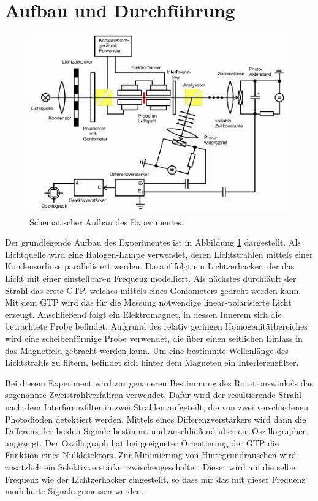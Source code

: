 \newpage
\section{Aufbau und Durchführung}

\begin{figure}
  \centering
  \includegraphics[width = \textwidth]{Pics/Aufbau.pdf}
  \caption{Schematischer Aufbau des Experimentes\cite{anleitung}.}
  \label{fig:Aufbau}
\end{figure}

Der grundlegende Aufbau des Experimentes ist in Abbildung \ref{fig:Aufbau}
dargestellt. Als Lichtquelle wird eine Halogen-Lampe verwendet, deren Lichtstrahlen
mittels einer Kondensorlinse parallelisiert werden. Darauf folgt ein Lichtzerhacker,
der das Licht mit einer einstellbaren Frequeuz modelliert. Als nächstes durchläuft
der Strahl das erste GTP, welches mittels eines Goniometers gedreht werden kann.
Mit dem GTP wird das für die Messung notwendige linear-polarisierte Licht erzeugt.
Anschließend folgt ein Elektromagnet, in dessen Innerem sich die betrachtete
Probe befindet. Aufgrund des relativ geringen Homogenitätbereiches wird eine
scheibenförmige Probe verwendet, die über einen seitlichen Einlass in das
Magnetfeld gebracht werden kann. Um eine bestimmte Wellenlänge des Lichtstrahls
zu filtern, befindet sich hinter dem Magneten ein Interferenzfilter.

Bei diesem Experiment wird zur genaueren Bestimmung des Rotationswinkels das
sogenannte Zweistrahlverfahren verwendet. Dafür wird der resultierende Strahl
nach dem Interferenzfilter in zwei Strahlen aufgeteilt, die von zwei verschiedenen
Photodioden detektiert werden. Mittels eines Differenzverstärkers wird dann die
Differenz der beiden Signale bestimmt und anschließend über ein Oszillographen
angezeigt. Der Oszillograph hat bei geeigneter Orientierung der GTP die Funktion
eines Nulldetektors. Zur Minimierung von Hintegrundrauschen wird zusätzlich ein Selektivverstärker
zwischengeschaltet. Dieser wird auf die selbe Frequenz wie der Lichtzerhacker
eingestellt, so dass nur das mit dieser Frequenz modulierte Signale gemessen werden.

